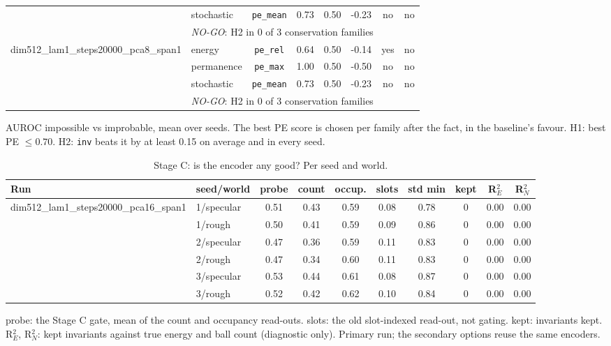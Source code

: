 \begin{table}[t]
\begin{adjustbox}{max width=\linewidth}
\begin{tabular}{llcccccc}
 & stochastic & \texttt{pe\_mean} & 0.73 & 0.50 & -0.23 & no & no\\
& \multicolumn{7}{l}{\emph{NO-GO}: H2 in 0 of 3 conservation families}\\\midrule
dim512\_lam1\_steps20000\_pca8\_span1 & energy & \texttt{pe\_rel} & 0.64 & 0.50 & -0.14 & yes & no\\
 & permanence & \texttt{pe\_max} & 1.00 & 0.50 & -0.50 & no & no\\
 & stochastic & \texttt{pe\_mean} & 0.73 & 0.50 & -0.23 & no & no\\
& \multicolumn{7}{l}{\emph{NO-GO}: H2 in 0 of 3 conservation families}\\\bottomrule
\end{tabular}\end{adjustbox}
\par\smallskip\footnotesize AUROC impossible vs improbable, mean over seeds. The best PE score is chosen per family after the fact, in the baseline's favour. H1: best PE $\le 0.70$. H2: \texttt{inv} beats it by at least 0.15 on average and in every seed.
\end{table}

\begin{table}[t]\centering\small
\caption{Stage C: is the encoder any good? Per seed and world.}\label{tab:stageCenc}
\begin{adjustbox}{max width=\linewidth}\begin{tabular}{llcccccccc}\toprule
Run & seed/world & probe & count & occup. & slots & std min & kept & R$^2_E$ & R$^2_N$\\\midrule
dim512\_lam1\_steps20000\_pca16\_span1 & 1/specular & 0.51 & 0.43 & 0.59 & 0.08 & 0.78 & 0 & 0.00 & 0.00\\
 & 1/rough & 0.50 & 0.41 & 0.59 & 0.09 & 0.86 & 0 & 0.00 & 0.00\\
 & 2/specular & 0.47 & 0.36 & 0.59 & 0.11 & 0.83 & 0 & 0.00 & 0.00\\
 & 2/rough & 0.47 & 0.34 & 0.60 & 0.11 & 0.83 & 0 & 0.00 & 0.00\\
 & 3/specular & 0.53 & 0.44 & 0.61 & 0.08 & 0.87 & 0 & 0.00 & 0.00\\
 & 3/rough & 0.52 & 0.42 & 0.62 & 0.10 & 0.84 & 0 & 0.00 & 0.00\\
\bottomrule
\end{tabular}\end{adjustbox}
\par\smallskip\footnotesize probe: the Stage C gate, mean of the count and occupancy read-outs. slots: the old slot-indexed read-out, not gating. kept: invariants kept. R$^2_E$, R$^2_N$: kept invariants against true energy and ball count (diagnostic only). Primary run; the secondary options reuse the same encoders.
\end{table}

